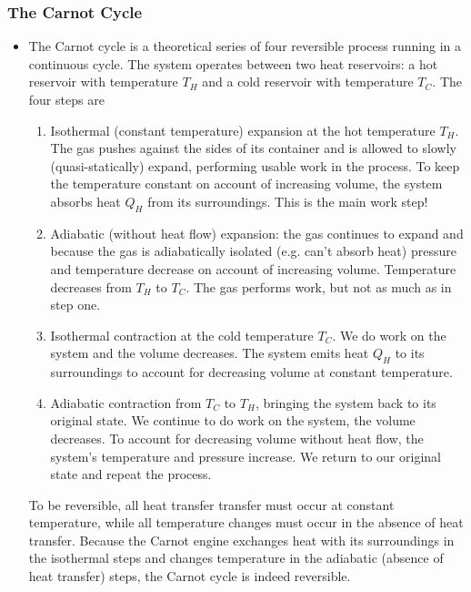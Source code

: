 \documentclass[11pt, a4paper]{article}
\begin{document}
\subsubsection{The Carnot Cycle}
\begin{itemize}
	\item The Carnot cycle is a theoretical series of four reversible process running in a continuous cycle. The system operates between two heat reservoirs: a hot reservoir with temperature $ T_{H} $ and a cold reservoir with temperature $ T_{C} $. The four steps are
	\begin{enumerate}
		\item Isothermal (constant temperature) expansion at the hot temperature $ T_{H} $. The gas pushes against the sides of its container and is allowed to slowly (quasi-statically) expand, performing usable work in the process. To keep the temperature constant on account of increasing volume, the system absorbs heat $ Q_{H} $ from its surroundings. This is the main work step!
		
		\item Adiabatic (without heat flow) expansion: the gas continues to expand and because the gas is adiabatically isolated (e.g. can't absorb heat) pressure and temperature decrease on account of increasing volume. Temperature decreases from $ T_{H} $ to $ T_{C} $. The gas performs work, but not as much as in step one.
		
		\item Isothermal contraction at the cold temperature $ T_{C} $. We do work on the system and the volume decreases. The system emits heat $ Q_{H} $ to its surroundings to account for decreasing volume at constant temperature.
		
		\item Adiabatic contraction from $ T_{C} $ to $ T_{H} $, bringing the system back to its original state. We continue to do work on the system, the volume decreases. To account for decreasing volume without heat flow, the system's temperature and pressure increase. We return to our original state and repeat the process.
	\end{enumerate}
	To be reversible, all heat transfer transfer must occur at constant temperature, while all temperature changes must occur in the absence of heat transfer. Because the Carnot engine exchanges heat with its surroundings in the isothermal steps and changes temperature in the adiabatic (absence of heat transfer) steps, the Carnot cycle is indeed reversible.


\end{itemize}
\end{document}
